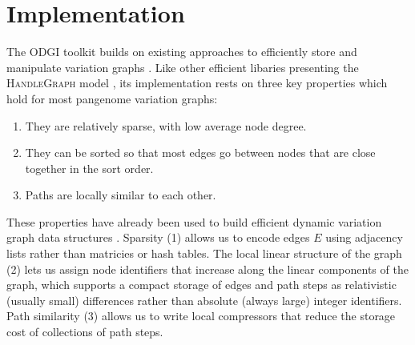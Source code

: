 \documentclass{bioinfo}
\begin{document}



\section{Implementation}

The ODGI toolkit builds on existing approaches to efficiently store and manipulate variation graphs \citep{Garrison:2018}.
Like other efficient libaries presenting the \textsc{HandleGraph} model \citep{Eizenga_2020_BX}, its implementation rests on three key properties which hold for most pangenome variation graphs:

\begin{enumerate}
\item They are relatively sparse, with low average node degree.
\item They can be sorted so that most edges go between nodes that are close together in the sort order.
\item Paths are locally similar to each other.
\end{enumerate}

These properties have already been used to build efficient dynamic variation graph data structures \citep{Siren:2020,Eizenga_2020_BX}.
Sparsity (1) allows us to encode edges $E$ using adjacency lists rather than matricies or hash tables.
The local linear structure of the graph (2) lets us assign node identifiers that increase along the linear components of the graph, which supports a compact storage of edges and path steps as relativistic (usually small) differences rather than absolute (always large) integer identifiers.
Path similarity (3) allows us to write local compressors that reduce the storage cost of collections of path steps.
\end{document}
